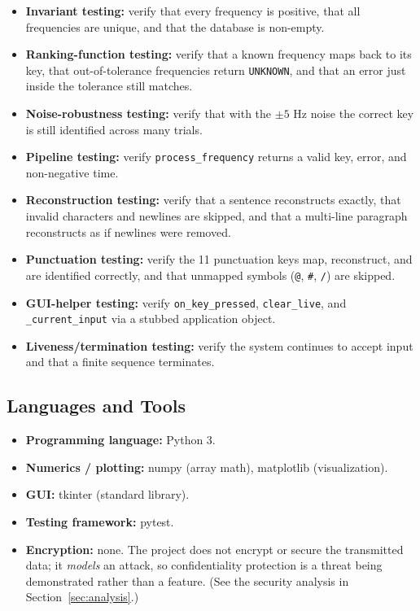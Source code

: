\documentclass[11pt,a4paper]{article}
\newcommand{\Key}[1]{\texttt{#1}}
\begin{document}
\begin{itemize}
    \item \textbf{Invariant testing:} verify that every frequency is positive,
          that all frequencies are unique, and that the database is non-empty.
    \item \textbf{Ranking-function testing:} verify that a known frequency maps
          back to its key, that out-of-tolerance frequencies return
          \Key{UNKNOWN}, and that an error just inside the tolerance still
          matches.
    \item \textbf{Noise-robustness testing:} verify that with the $\pm 5$ Hz
          noise the correct key is still identified across many trials.
    \item \textbf{Pipeline testing:} verify \texttt{process\_frequency}
          returns a valid key, error, and non-negative time.
    \item \textbf{Reconstruction testing:} verify that a sentence reconstructs
          exactly, that invalid characters and newlines are skipped, and that a
          multi-line paragraph reconstructs as if newlines were removed.
    \item \textbf{Punctuation testing:} verify the 11 punctuation keys map,
          reconstruct, and are identified correctly, and that unmapped symbols
          (\texttt{@}, \texttt{\#}, \texttt{/}) are skipped.
    \item \textbf{GUI-helper testing:} verify \texttt{on\_key\_pressed},
          \texttt{clear\_live}, and \texttt{\_current\_input} via a stubbed
          application object.
    \item \textbf{Liveness/termination testing:} verify the system continues to
          accept input and that a finite sequence terminates.
\end{itemize}

\subsection{Languages and Tools}

\begin{itemize}
    \item \textbf{Programming language:} Python 3.
    \item \textbf{Numerics / plotting:} numpy (array math), matplotlib
          (visualization).
    \item \textbf{GUI:} tkinter (standard library).
    \item \textbf{Testing framework:} pytest.
    \item \textbf{Encryption:} none. The project does not encrypt or secure the
          transmitted data; it \emph{models} an attack, so confidentiality
          protection is a threat being demonstrated rather than a feature.
          (See the security analysis in Section~\ref{sec:analysis}.)
\end{itemize}
\end{document}
